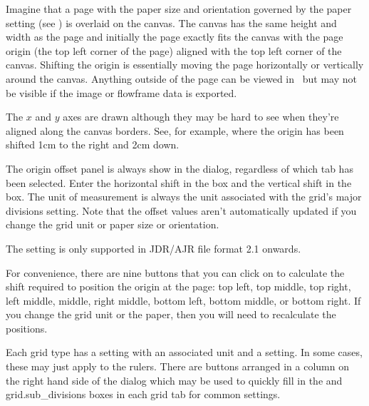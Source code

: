 Imagine that a page with the paper size
and orientation governed by the paper setting (see
) is overlaid on the \gls{canvas}. The
\gls{canvas} has the same height and width as the page and initially
the page exactly fits the \gls{canvas} with the page \gls{origin} (the top
left corner of the page) aligned with the top left corner of the
\gls{canvas}. Shifting the \gls{origin} is essentially moving the page
horizontally or vertically around the \gls{canvas}. Anything outside
of the page can be viewed in \FlowframTk\ but may not be visible if
the image or \gls{flowframe} data is exported.

The $x$ and $y$ axes are drawn although they may be hard to see when
they're aligned along the \gls{canvas} borders. See, for example, 
 where the \gls{origin} has been
shifted 1cm to the right and 2cm down.


The \gls{origin} offset panel is always show in the 
dialog, regardless of which tab has been selected.
Enter the horizontal shift in the  box
and the vertical shift in the  box. The unit of
measurement is always the unit associated with the grid's major
divisions setting. Note that the offset values aren't automatically
updated if you change the grid unit or paper size or orientation.

\begin{information}
The  setting is only supported in
\gls{JDR}\slash\gls{AJR} file format 2.1 onwards.
\end{information}

For convenience, there are nine buttons that you can click on to
calculate the shift required to position the \gls{origin} at the page:
top left, top middle, top right, left middle, middle, right middle,
bottom left, bottom middle, or bottom right. If you change the grid
unit or the paper, then you will need to recalculate the positions.

Each grid type has a  setting with an
associated unit and a  setting. In
some cases, these may just apply to the \glspl{ruler}.
There are buttons arranged in a column on the right hand side
of the  dialog which may be used to quickly fill in the
 and \gls{grid.sub_divisions} boxes in each grid tab for common
settings.

